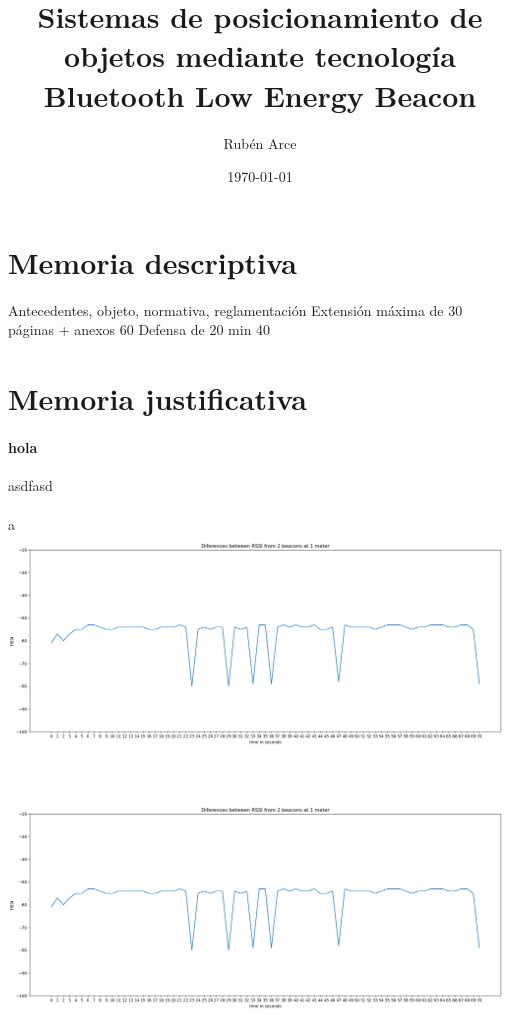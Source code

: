 \documentclass[a4paper ,12pt, onecolumn]{article}
\begin{document}
\title{Sistemas de posicionamiento de objetos mediante tecnología Bluetooth Low Energy
Beacon }
\author{Rubén Arce}
\date{\today}
\maketitle
\tableofcontents
\cleardoublepage
\section{Memoria descriptiva}
Antecedentes, objeto, normativa, reglamentación
Extensión máxima de 30 páginas + anexos 60
Defensa de 20 min  40
\section{Memoria justificativa}
\paragraph{hola}
asdfasd
\paragraph{}
a
\includegraphics[scale=0.3]{5min_beacon_rssi}
\includegraphics[width=15cm, height=8cm]{5min_beacon_rssi}
\end{document}
